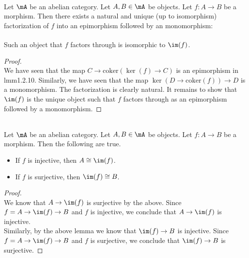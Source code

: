 \documentclass[a4paper]{article}
\begin{document}
\begin{lmm}{}{}\\
Let $\mA$ be an abelian category. Let $A,B\in\mA$ be objects. Let $f:A\to B$ be a morphism. Then there exists a natural and unique (up to isomorphism) factorization of $f$ into an epimorphism followed by an monomorphism: \\
 \\
Such an object that $f$ factors through is isomorphic to $\im(f)$. 
\begin{proof}\\
We have seen that the map $C\to\text{coker}(\ker(f)\to C)$ is an epimorphism in lmm1.2.10. Similarly, we have seen that the map $\ker(D\to\text{coker}(f))\to D$ is a monomorphism. The factorization is clearly natural. It remains to show that $\im(f)$ is the unique object such that $f$ factors through as an epimorphism followed by a monomorphism. 
\end{proof}
\end{lmm}

\begin{lmm}{}{}\\
Let $\mA$ be an abelian category. Let $A,B\in\mA$ be objects. Let $f:A\to B$ be a morphism. Then the following are true. 
\begin{itemize}
\item If $f$ is injective, then $A\cong\im(f)$. 
\item If $f$ is surjective, then $\im(f)\cong B$. 
\end{itemize}
\begin{proof}\\
We know that $A\to\im(f)$ is surjective by the above. Since $f=A\to\im(f)\to B$ and $f$ is injective, we conclude that $A\to\im(f)$ is injective. \\

Similarly, by the above lemma we know that $\im(f)\to B$ is injective. Since $f=A\to\im(f)\to B$ and $f$ is surjective, we conclude that $\im(f)\to B$ is surjective. 
\end{proof}
\end{lmm}
\end{document}
